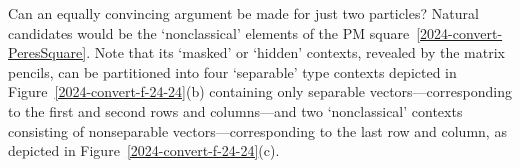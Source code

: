 \documentclass[
  twocolumn,
 showpacs,
 showkeys,
 preprintnumbers,
 amsmath,amssymb,
 aps,
 prl,
  longbibliography,
 floatfix,
 ]{revtex4-2}
\newcommand\myotimes{ }
\begin{document}
Can an equally convincing argument be made for just two particles?
Natural candidates would be the `nonclassical' elements of the PM square~\eqref{2024-convert-PeresSquare}.
Note that its `masked' or `hidden' contexts, revealed by the matrix pencils, can be partitioned into four `separable' type contexts
depicted in Figure~\ref{2024-convert-f-24-24}(b)
containing only separable vectors---corresponding to the first and second rows and columns---and two `nonclassical' contexts consisting of nonseparable
vectors---corresponding to the last row and column, as depicted in
Figure~\ref{2024-convert-f-24-24}(c).
\end{document}
